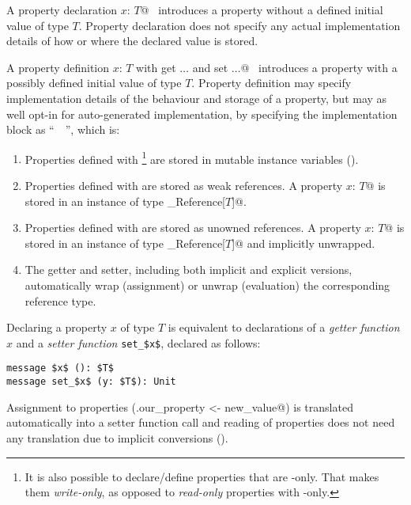 A property declaration \lstinline@val $x$: $T$@~ introduces a property without a defined initial value of type $T$. Property declaration does not specify any actual implementation details of how or where the declared value is stored.

A property definition \lstinline@let $x$: $T$ with get $\ldots$ and set $\ldots$@~ introduces a property with a possibly defined initial value of type $T$. Property definition may specify implementation details of the behaviour and storage of a property, but may as well opt-in for auto-generated implementation, by specifying the implementation block as ``~\code{_}~'', which is: 

\begin{enumerate}
  \item Properties defined with \footnote{It is also possible to declare/define properties that are -only. That makes them {\em write-only}, as opposed to {\em read-only} properties with -only.} are stored in mutable instance variables (). 

  \item Properties defined with  are stored as weak references. A property \lstinline@val $x$: $T$@ is stored in an instance of type \lstinline@Weak_Reference[$T$]@. 

  \item Properties defined with  are stored as unowned references. A property \lstinline@val $x$: $T$@ is stored in an instance of type \lstinline@Weak_Reference[$T$]@ and implicitly unwrapped. 

  \item The getter and setter, including both implicit and explicit versions, automatically wrap (assignment) or unwrap (evaluation) the corresponding reference type.
\end{enumerate}

Declaring a property $x$ of type $T$ is equivalent to declarations of a {\em getter function} $x$ and a {\em setter function} \lstinline!set_$x$!, declared as follows:

\begin{lstlisting}
message $x$ (): $T$
message set_$x$ (y: $T$): Unit
\end{lstlisting}

Assignment to properties (\lstinline@obj.our_property <- new_value@) is translated automatically into a setter function call and reading of properties does not need any translation due to implicit conversions (). 








